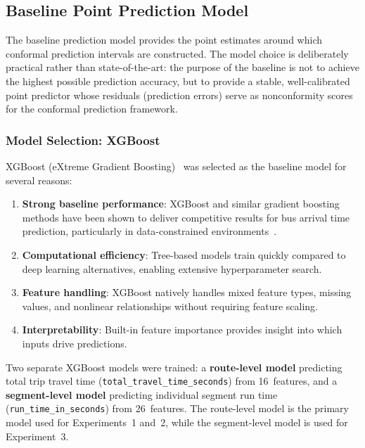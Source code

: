 \subsection{Baseline Point Prediction Model}
\label{subsec:baseline_model}

The baseline prediction model provides the point estimates around which conformal prediction intervals are constructed. The model choice is deliberately practical rather than state-of-the-art: the purpose of the baseline is not to achieve the highest possible prediction accuracy, but to provide a stable, well-calibrated point predictor whose residuals (prediction errors) serve as nonconformity scores for the conformal prediction framework.

\subsubsection{Model Selection: XGBoost}
\label{subsubsec:model_selection}

XGBoost (eXtreme Gradient Boosting)~\cite{chen2016xgboost} was selected as the baseline model for several reasons:
\begin{enumerate}
    \item \textbf{Strong baseline performance}: XGBoost and similar gradient boosting methods have been shown to deliver competitive results for bus arrival time prediction, particularly in data-constrained environments~\cite{kam2023boosting}.
    \item \textbf{Computational efficiency}: Tree-based models train quickly compared to deep learning alternatives, enabling extensive hyperparameter search.
    \item \textbf{Feature handling}: XGBoost natively handles mixed feature types, missing values, and nonlinear relationships without requiring feature scaling.
    \item \textbf{Interpretability}: Built-in feature importance provides insight into which inputs drive predictions.
\end{enumerate}

Two separate XGBoost models were trained: a \textbf{route-level model} predicting total trip travel time (\texttt{total\_travel\_time\_seconds}) from 16~features, and a \textbf{segment-level model} predicting individual segment run time (\texttt{run\_time\_in\_seconds}) from 26~features. The route-level model is the primary model used for Experiments~1 and~2, while the segment-level model is used for Experiment~3.

